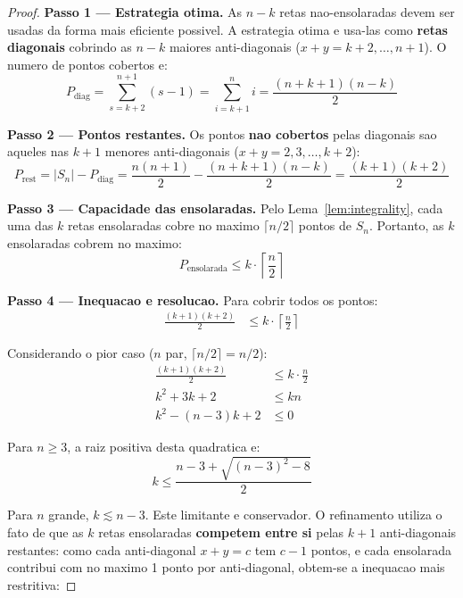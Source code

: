 \documentclass[5p]{elsarticle}
\theoremstyle{definition}
\begin{document}
\begin{proof}
  \textbf{Passo 1 — Estrategia otima.}
  As $n-k$ retas nao-ensolaradas devem ser usadas da forma mais eficiente possivel.
  A estrategia otima e usa-las como \textbf{retas diagonais} cobrindo as $n-k$
  maiores anti-diagonais ($x+y = k+2, \dots, n+1$). O numero de pontos cobertos e:
  \begin{equation}\label{eq:diag-cover}
    P_{\text{diag}} = \sum_{s=k+2}^{n+1} (s-1) = \sum_{i=k+1}^{n} i
    = \frac{(n+k+1)(n-k)}{2}
  \end{equation}

  \textbf{Passo 2 — Pontos restantes.}
  Os pontos \textbf{nao cobertos} pelas diagonais sao aqueles nas $k+1$ menores
  anti-diagonais ($x+y = 2, 3, \dots, k+2$):
  \begin{equation}\label{eq:remain2}
    P_{\text{rest}} = |S_n| - P_{\text{diag}}
    = \frac{n(n+1)}{2} - \frac{(n+k+1)(n-k)}{2}
    = \frac{(k+1)(k+2)}{2}
  \end{equation}

  \textbf{Passo 3 — Capacidade das ensolaradas.}
  Pelo Lema~\ref{lem:integrality}, cada uma das $k$ retas ensolaradas cobre no
  maximo $\lceil n/2 \rceil$ pontos de $S_n$. Portanto, as $k$ ensolaradas cobrem
  no maximo:
  \begin{equation}\label{eq:sunny-cap}
    P_{\text{ensolarada}} \leq k \cdot \left\lceil \frac{n}{2} \right\rceil
  \end{equation}

  \textbf{Passo 4 — Inequacao e resolucao.}
  Para cobrir todos os pontos:
  \begin{align}
    \frac{(k+1)(k+2)}{2} &\leq k \cdot \left\lceil \frac{n}{2} \right\rceil
  \end{align}

  Considerando o pior caso ($n$ par, $\lceil n/2 \rceil = n/2$):
  \begin{align}
    \frac{(k+1)(k+2)}{2} &\leq k \cdot \frac{n}{2} \\
    k^2 + 3k + 2 &\leq kn \\
    k^2 - (n-3)k + 2 &\leq 0
  \end{align}

  Para $n \geq 3$, a raiz positiva desta quadratica e:
  \begin{equation}
    k \leq \frac{n-3 + \sqrt{(n-3)^2 - 8}}{2}
  \end{equation}

  Para $n$ grande, $k \lesssim n - 3$. Este limitante e conservador. O refinamento
  utiliza o fato de que as $k$ retas ensolaradas \textbf{competem entre si} pelas
  $k+1$ anti-diagonais restantes: como cada anti-diagonal $x+y = c$ tem $c-1$ pontos,
  e cada ensolarada contribui com no maximo 1 ponto por anti-diagonal,
  obtem-se a inequacao mais restritiva:


\end{proof}
\end{document}
